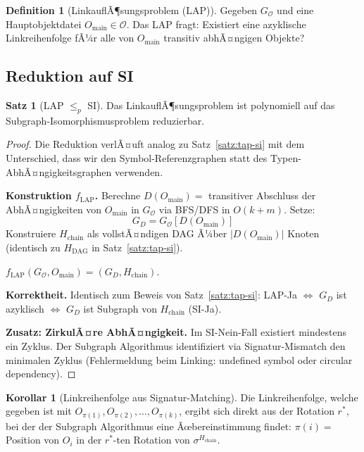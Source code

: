 ﻿\documentclass[a4paper,12pt]{article}
\theoremstyle{definition}
\newtheorem{definition}{Definition}
\newtheorem{satz}{Satz}
\newtheorem{korollar}{Korollar}
\begin{document}
\begin{definition}[LinkauflÃ¶sungsproblem (LAP)]
\label{def:lap}
Gegeben $G_{\mathcal{O}}$ und eine Hauptobjektdatei $O_{\text{main}} \in \mathcal{O}$. Das LAP fragt: Existiert eine azyklische Linkreihenfolge fÃ¼r alle von $O_{\text{main}}$ transitiv abhÃ¤ngigen Objekte?
\end{definition}

\subsection{Reduktion auf SI}

\begin{satz}[LAP $\leq_p$ SI]
\label{satz:lap-si}
Das LinkauflÃ¶sungsproblem ist polynomiell auf das Subgraph-Isomorphismusproblem reduzierbar.
\end{satz}

\begin{proof}
Die Reduktion verlÃ¤uft analog zu Satz~\ref{satz:tap-si} mit dem Unterschied, dass wir den Symbol-Referenzgraphen statt des Typen-AbhÃ¤ngigkeitsgraphen verwenden.

\textbf{Konstruktion $f_{\text{LAP}}$.}
Berechne $D(O_{\text{main}}) = $ transitiver Abschluss der AbhÃ¤ngigkeiten von $O_{\text{main}}$ in $G_{\mathcal{O}}$ via BFS/DFS in $O(k + m)$. Setze:
\[
G_D = G_{\mathcal{O}}[D(O_{\text{main}})]
\]
Konstruiere $H_{\text{chain}}$ als vollstÃ¤ndigen DAG Ã¼ber $|D(O_{\text{main}})|$ Knoten (identisch zu $H_{\text{DAG}}$ in Satz~\ref{satz:tap-si}).

$f_{\text{LAP}}(G_{\mathcal{O}}, O_{\text{main}}) = (G_D, H_{\text{chain}})$.

\textbf{Korrektheit.}
Identisch zum Beweis von Satz~\ref{satz:tap-si}: LAP-Ja $\Leftrightarrow$ $G_D$ ist azyklisch $\Leftrightarrow$ $G_D$ ist Subgraph von $H_{\text{chain}}$ (SI-Ja).

\textbf{Zusatz: ZirkulÃ¤re AbhÃ¤ngigkeit.}
Im SI-Nein-Fall existiert mindestens ein Zyklus. Der Subgraph Algorithmus identifiziert via Signatur-Mismatch den minimalen Zyklus (Fehlermeldung beim Linking: undefined symbol oder circular dependency).
\end{proof}

\begin{korollar}[Linkreihenfolge aus Signatur-Matching]
Die Linkreihenfolge, welche gegeben ist mit $O_{\pi(1)}, O_{\pi(2)}, \ldots, O_{\pi(k)}$, ergibt sich direkt aus der Rotation $r^*$, bei der der Subgraph Algorithmus eine Ãœbereinstimmung findet: $\pi(i) = $ Position von $O_i$ in der $r^*$-ten Rotation von $\sigma^{H_{\text{chain}}}$.
\end{korollar}
\end{document}

